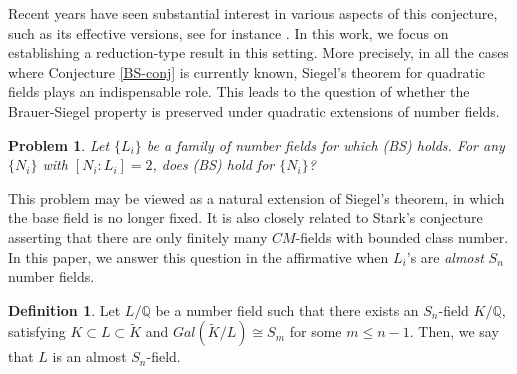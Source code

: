\documentclass[12pt]{amsart}
\newtheorem{problem}[theorem]{Problem}
\theoremstyle{definition}
\newtheorem{definition}[theorem]{Definition}
\newcommand{\Q}{\mathbb{Q}}
\begin{document}

Recent years have seen substantial interest in various aspects of this conjecture, such as its effective versions, see for instance \cite{asif}. In this work, we focus on establishing a reduction-type result in this setting. More precisely, in all the cases where Conjecture \ref{BS-conj} is currently known, Siegel's theorem for quadratic fields plays an indispensable role. This leads to the question of whether the Brauer-Siegel property is preserved under quadratic extensions of number fields.


\begin{problem}
    Let $\{L_i\}$ be a family of number fields for which (BS) holds. For any $\{N_i\}$ with $[N_i:L_i]=2$, does (BS) hold for $\{N_i\}$?
\end{problem}

This problem may be viewed as a natural extension of Siegel's theorem, in which the base field is no longer fixed. It is also closely related to Stark's conjecture asserting that there are only finitely many $CM$-fields with bounded class number. In this paper, we answer this question in the affirmative when $L_i$'s are \textit{almost} $S_n$ number fields.

\medskip

\begin{definition}
    Let $L/\Q$ be a number field such that there exists an $S_n$-field $K/\Q$, satisfying $K\subset L\subset \widetilde{K}$ and $Gal(\widetilde{K}/L) \cong  S_m$ for some $m\leq n-1$. Then, we say that $L$ is an almost $S_n$-field.
\end{definition}

\end{document}
